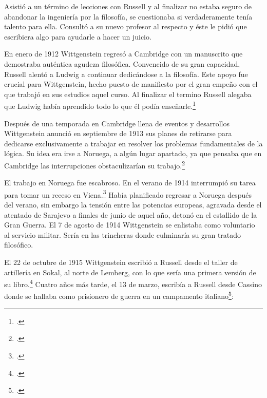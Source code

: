     Asistió a un término de lecciones con Russell y al finalizar no estaba seguro de
    abandonar la ingeniería por la filosofía, se cuestionaba si verdaderamente tenía
    talento para ella. Consultó a su nuevo profesor al respecto y éste le pidió que
    escribiera algo para ayudarle a hacer un juicio.

    En enero de 1912 Wittgenstein regresó a Cambridge con un manuscrito que
    demostraba auténtica agudeza filosófica. Convencido de su gran capacidad,
    Russell alentó a Ludwig a continuar dedicándose a la filosofía. Este apoyo fue
    crucial para Wittgenstein, hecho puesto de manifiesto por el gran empeño con el
    que trabajó en sus estudios aquel curso. Al finalizar el termino Russell alegaba
    que Ludwig había aprendido todo lo que él podía enseñarle.\footcite[cap. 3 loc
    865]{monk}

    Después de una temporada en Cambridge llena de eventos y desarrollos
    Wittgenstein anunció en septiembre de 1913 sus planes de retirarse para
    dedicarse exclusivamente a trabajar en resolver los problemas fundamentales de
    la lógica. Su idea era irse a Noruega, a algún lugar apartado, ya que pensaba
    que en Cambridge las interrupciones obstaculizarían su trabajo.\footcite[cap. 4
    loc 1844]{monk}

     El trabajo en Noruega fue escabroso.
    En el verano de 1914 interrumpió su tarea para tomar un receso en
    Viena.\footcite[cap. 5 loc 2154]{monk} Había planificado regresar a Noruega
    después del verano, sin embargo la tensión entre las potencias europeas,
    agravada desde el atentado de Sarajevo a finales de junio de aquel año, detonó
    en el estallido de la Gran Guerra. El 7 de agosto de 1914 Wittgenstein se
    enlistaba como voluntario al servicio militar. Sería en las trincheras donde
    culminaría su gran tratado filosófico.

    El 22 de octubre de 1915 Wittgenstein escribió a Russell desde el taller de
    artillería en Sokal, al norte de Lemberg, con lo que sería una primera versión
    de su libro.\footcite[cf. p.84]{cambridgeletters} Cuatro años más tarde, el 13
    de marzo, escribía a Russell desde Cassino donde se hallaba como prisionero de
    guerra en un campamento italiano\footcite[cf. p.268]{mcguinness}: 

